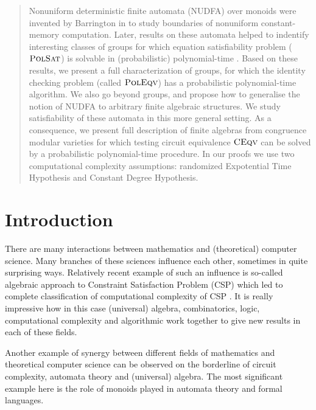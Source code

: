 \documentclass[11pt,a4paper]{amsart}
\newcommand{\polsat}[1]{\textsc{PolSat}\left( {\m #1} \right)}
\newcommand{\m}[1]{{\uppercase {\bf{#1}}}}
\newcommand{\gProblem}[2]{\ensuremath{\operatorname{\textup{\textsc{{#2}}}}
		\ifthenelse{\equal{#1}{}}{}{\!\left( {#1} \right)}}}
\renewcommand{\polsat}[1]{\gProblem{#1}{PolSat}}
\newcommand{\poleqv}[1]{\gProblem{#1}{PolEqv}}
\newcommand{\ceqv}[1]{\gProblem{#1}{CEqv}}
\begin{document}
\begin{abstract}
Nonuniform deterministic finite automata (NUDFA) over monoids were invented by Barrington in \cite{Barrington85} to study boundaries of nonuniform constant-memory computation. Later, results on these automata helped to indentify interesting classes of groups for which  equation satisfiability problem (\polsat{}) is solvable in (probabilistic) polynomial-time \cite{GoldmannR02, IdziakKKW22-icalp}. Based on these results, we present a full characterization of groups, for which the identity checking problem (called \poleqv{}) has a probabilistic polynomial-time algorithm. We also go beyond groups, and propose how to generalise the notion of NUDFA to arbitrary finite algebraic structures. We study satisfiability of these automata in this more general setting. As a consequence, we present full description of finite algebras from congruence modular varieties for which testing circuit equivalence $\ceqv{}$ can be solved by a probabilistic polynomial-time procedure. In our proofs we use two computational complexity assumptions: randomized Expotential Time Hypothesis and Constant Degree Hypothesis.
\end{abstract}



\maketitle

\newpage

\section{Introduction}
There are many interactions between mathematics and (theoretical) computer science. 
Many branches of these sciences influence each other, sometimes in quite surprising ways.
Relatively recent example of such an influence is so-called algebraic approach to Constraint Satisfaction Problem (CSP) which led to complete classification of computational complexity of CSP \cite{Bulatov-dichotomy,Zhuk-dichotomy}.
It is really impressive how in this case (universal) algebra, combinatorics, logic, computational complexity and algorithmic work together to give new results in each of these fields.


Another example of synergy between different fields of mathematics and theoretical computer science can be observed on the borderline of circuit complexity, automata theory and (universal) algebra.
The most significant example here is the role of monoids played in automata theory and formal languages.
\end{document}
